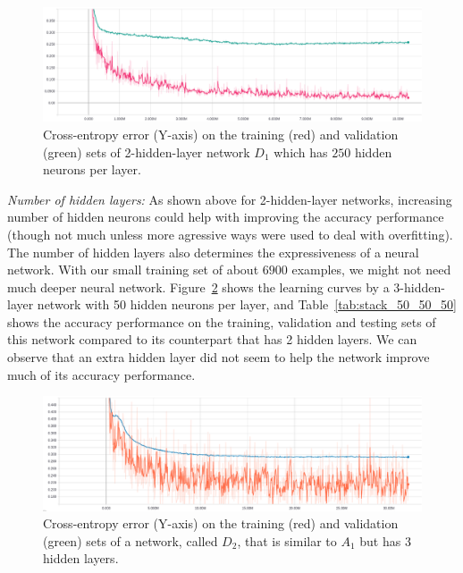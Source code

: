 \documentclass[12pt]{article}
\begin{document}
\begin{figure}
  \includegraphics[width=\linewidth]{figures/stack_250_250_dropout_elu/learning_curves.eps}
  \caption{Cross-entropy error (Y-axis) on the training (red) and validation (green) sets of 2-hidden-layer network $D_1$ which has $250$ hidden neurons per layer.}
  \label{fig:stack_250_250_dropout_elu}
\end{figure}

\textit{Number of hidden layers:} As shown above for 2-hidden-layer networks, increasing number of hidden neurons could help with improving the accuracy performance (though not much unless more agressive ways were used to deal with overfitting). The number of hidden layers also determines the expressiveness of a neural network. With our small training set of about $6900$ examples, we might not need much deeper neural network. Figure~\ref{fig:stack_50_50_50} shows the learning curves by a 3-hidden-layer network with 50 hidden neurons per layer, and Table~\ref{tab:stack_50_50_50} shows the accuracy performance on the training, validation and testing sets of this network compared to its counterpart that has 2 hidden layers. We can observe that an extra hidden layer did not seem to help the network improve much of its accuracy performance.

\begin{figure}
  \includegraphics[width=\linewidth]{figures/stack_50_50_50_dropout_elu/learning_curves.eps}
  \caption{Cross-entropy error (Y-axis) on the training (red) and validation (green) sets of a network, called $D_2$, that is similar to $A_1$ but has 3 hidden layers.}
  \label{fig:stack_50_50_50}
\end{figure}
\end{document}

